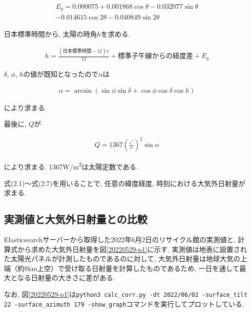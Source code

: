 \begin{eqnarray}
  \begin{split}
    E_q =  0.000075+0.001868\cos \theta-0.032077\sin \theta\\
    -0.014615\cos 2\theta-0.040849\sin 2\theta
  \end{split}
\end{eqnarray}

日本標準時間から, 太陽の時角$h$を求める.

\begin{eqnarray}
  h = \frac{(日本標準時間-12)\pi}{12}+標準子午線からの経度差+E_q
\end{eqnarray}

$\delta$, $\phi$, $h$の値が既知となったので$\alpha$は

\begin{eqnarray}
  \alpha = \arcsin (\sin \phi\sin \delta+\cos \phi\cos \delta\cos h)
\end{eqnarray}

により求まる.

最後に, $Q$が

\begin{eqnarray}
  Q = 1367(\frac{r^{*}}{r})^{2}\sin \alpha
\end{eqnarray}

により求まる. 1367\si{\watt}/\si{\metre\squared}は太陽定数である.

式(2.1)～式(2.7)を用いることで, 任意の緯度経度, 時刻における大気外日射量が求まる.


\subsection{実測値と大気外日射量との比較}
Elasticsearchサーバーから取得した2022年6月2日のリサイクル館の実測値と, 計算式から求めた大気外日射量を図\ref{20220529-p1}に示す. 実測値は地表に設置された太陽光パネルが計測したものであるのに対して, 大気外日射量は地球大気の上端（約8km上空）で受け取る日射量を計算したものであるため, 一日を通して最大となる日射量の大きさに差がある.

なお, 図\ref{20220529-p1}は\texttt{python3 calc_corr.py -dt 2022/06/02 -surface_tilt 22 -surface_azimuth 179 -show_graph}コマンドを実行してプロットしている.

